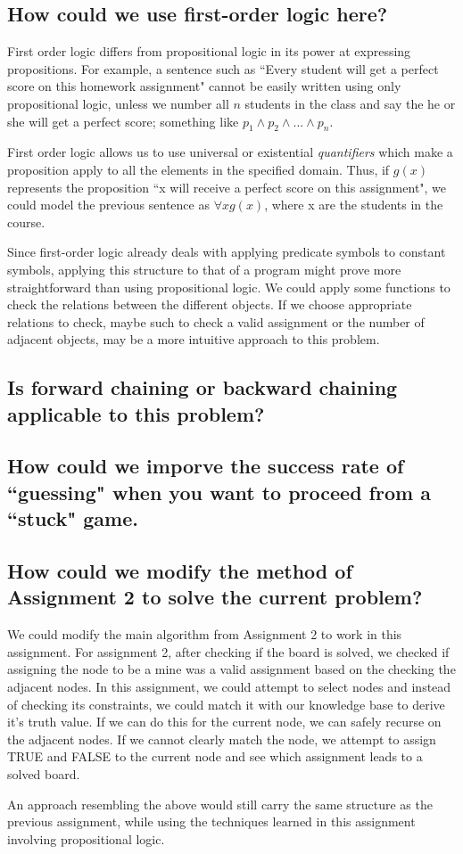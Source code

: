 \documentclass{article}
\begin{document}
	\subsection{How could we use first-order logic here?}
		First order logic differs from propositional logic in its power at expressing propositions. For 
		example, a sentence such as ``Every student will get a perfect score on this homework assignment"
		cannot be easily written using only propositional logic, unless we number all $n$  students  in the
		class and say the he or she will get a perfect score; something like 
		$p_{1}\land p_{2}\land ...\land p_{n}$.
		
		First order logic allows us to use universal or existential \textit{quantifiers} which make a 
		proposition apply to all the elements in the specified domain. Thus, if $g(x)$ represents the 
		proposition ``x will receive a perfect score on this assignment", we could model the previous
		sentence as $\forall x g(x)$, where x are the students in the course.
	
		Since first-order logic already deals with applying predicate symbols to constant symbols,
		applying this structure to that of a program might prove more straightforward than using 
		propositional logic. We could apply some functions to check the relations between the different
		objects. If we choose appropriate relations to check, maybe such to check a valid assignment 
		or the number of adjacent objects, may be a more intuitive approach to this problem.
	\subsection{Is forward chaining or backward chaining applicable to this problem?}
	\subsection{How could we imporve the success rate of ``guessing" when you want to proceed from a
			``stuck" game.}
	\subsection{How could we modify the method of Assignment 2 to solve the current problem?}
		We could modify the main algorithm from Assignment 2 to work in this assignment. For assignment
		2, after checking if the board is solved, we checked if assigning the node to be a mine was a 
		valid assignment based on the checking the adjacent nodes. In this assignment, we could attempt
		to select nodes and instead of checking its constraints, we could match it with our knowledge base
		to derive it's truth value. If we can do this for the current node, we can safely recurse on the
		adjacent nodes. If we cannot clearly match the node, we attempt to assign TRUE and FALSE to the 
		current node and see which assignment leads to a solved board.

		An approach resembling the above would still carry the same structure as the previous assignment,
		while using the techniques learned in this assignment involving propositional logic.
\end{document}
